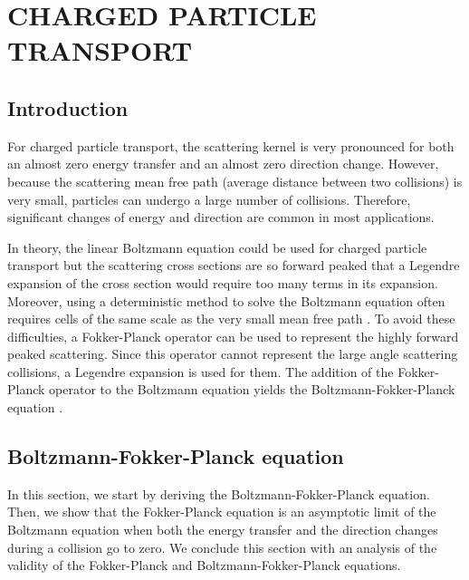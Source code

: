 \chapter{\uppercase{Charged particle transport}} \label{cp_transport_chapter}
\section{Introduction}
For charged particle transport, the scattering kernel is very pronounced 
for both an almost zero energy transfer and an almost zero direction 
change. However, because the
scattering mean free path (average distance between two collisions) is very
small, particles can undergo a large number of collisions. Therefore,
significant changes of energy and direction are common in most applications.

In theory, the linear Boltzmann equation could be used for charged particle
transport but the scattering cross sections are so forward peaked that a Legendre 
expansion of the cross section would require too many terms in its expansion. 
Moreover, using a deterministic method to solve the Boltzmann equation often 
requires cells of the same scale as the very small mean free path \cite{pomraning}. 
To avoid these difficulties, a Fokker-Planck operator can
be used to represent the highly forward peaked scattering. Since this operator 
cannot represent the large angle scattering collisions, a Legendre expansion 
is used for them. The addition of the Fokker-Planck operator to the 
Boltzmann equation yields the Boltzmann-Fokker-Planck equation \cite{ligou}.

\section{Boltzmann-Fokker-Planck equation}
In this section, we start by deriving the Boltzmann-Fokker-Planck equation.
Then, we show that the Fokker-Planck equation is an asymptotic limit of the 
Boltzmann equation when both the energy transfer and the direction changes 
during a collision go to zero. We conclude this section with an analysis of 
the validity of the Fokker-Planck and Boltzmann-Fokker-Planck equations.
